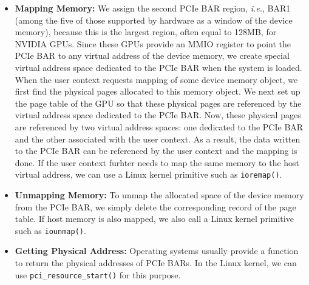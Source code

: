 \begin{itemize} \itemsep1pt
 \item \textbf{Mapping Memory:}
       We assign the second PCIe BAR region, \textit{i.e.}, BAR1 (among
       the five of those supported by hardware as a window of the device
       memory), because this is the largest region, often equal to 128MB,
       for NVIDIA GPUs.
       Since these GPUs provide an MMIO register to point the PCIe BAR
       to any virtual address of the device 
       memory, we create special virtual address space dedicated to the
       PCIe BAR when the system is loaded.
       When the user context requests mapping of some device memory
       object, we first find the physical pages allocated to this
       memory object.
       We next set up the page table of the GPU so that these
       physical pages are referenced by the virtual address space
       dedicated to the PCIe BAR.
       Now, these physical pages are referenced by two virtual address
       spaces: one dedicated to the PCIe BAR and the other associated
       with the user context.
       As a result, the data written to the PCIe BAR can be referenced
       by the user context and the mapping is done.
       If the user context furhter needs to map the same memory to the
       host virtual address, we can use a Linux kernel primitive such as
       {\tt ioremap()}.
 \item \textbf{Unmapping Memory:}
       To unmap the allocated space of the device memory from the PCIe
       BAR, we simply delete the corresponding record of the page table.
       If host memory is also mapped, we also call a Linux kernel
       primitive such as {\tt iounmap()}.
 \item \textbf{Getting Physical Address:}
       Operating systems usually provide a function to return the physical
       addresses of PCIe BARs.
       In the Linux kernel, we can use {\tt pci\_resource\_start()} for
       this purpose.
\end{itemize}
